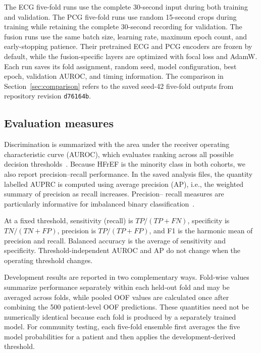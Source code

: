 \documentclass[11pt,a4paper]{article}
\begin{document}
The ECG five-fold runs use the complete 30-second input during both training
and validation. The PCG five-fold runs use random 15-second crops during
training while retaining the complete 30-second recording for validation. The
fusion runs use the same batch size, learning rate, maximum epoch count, and
early-stopping patience. Their pretrained ECG and PCG encoders are frozen by
default, while the fusion-specific layers are optimized with focal loss and
AdamW. Each run saves its fold assignment, random seed, model configuration,
best epoch, validation AUROC, and timing information. The comparison in
Section~\ref{sec:comparison} refers to the saved seed-42 five-fold outputs from
repository revision \texttt{d76164b}.

\subsection{Evaluation measures}

Discrimination is summarized with the area under the receiver operating
characteristic curve (AUROC), which evaluates ranking across all possible
decision thresholds~\cite{fawcett2006roc}. Because HFrEF is the minority class
in both cohorts, we also report precision--recall performance. In the saved
analysis files, the quantity labelled AUPRC is computed using average precision
(AP), i.e., the weighted summary of precision as recall increases. Precision--
recall measures are particularly informative for imbalanced binary
classification~\cite{saito2015pr}.

At a fixed threshold, sensitivity (recall) is
$TP/(TP+FN)$, specificity is $TN/(TN+FP)$, precision is $TP/(TP+FP)$, and
F1 is the harmonic mean of precision and recall. Balanced accuracy is the
average of sensitivity and specificity. Threshold-independent AUROC and AP do
not change when the operating threshold changes.

Development results are reported in two complementary ways. Fold-wise values
summarize performance separately within each held-out fold and may be averaged
across folds, while pooled OOF values are calculated once after combining the
500 patient-level OOF predictions. These quantities need not be numerically
identical because each fold is produced by a separately trained model. For
community testing, each five-fold ensemble first averages the five model
probabilities for a patient and then applies the development-derived threshold.
\end{document}
